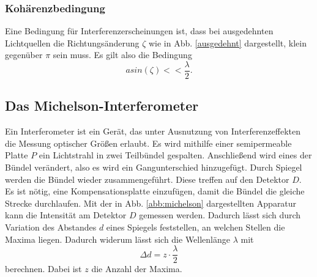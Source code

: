 
\subsubsection{Kohärenzbedingung}
Eine Bedingung für Interferenzerscheinungen ist, dass bei ausgedehnten 
Lichtquellen die Richtungsänderung $\zeta$ wie in Abb. \ref{ausgedehnt} dargestellt, 
klein gegenüber $\pi$ sein muss. Es gilt also die Bedingung 
\begin{equation*}
    a sin(\zeta) << \frac{\lambda}{2}.
\end{equation*}


\subsection{Das Michelson-Interferometer}
Ein Interferometer ist ein Gerät, das unter Ausnutzung von Interferenzeffekten die 
Messung optischer Größen erlaubt. 
Es wird mithilfe einer semipermeable Platte $P$ ein Lichtstrahl in zwei Teilbündel 
gespalten. Anschließend wird eines der Bündel verändert, also es wird ein Gangunterschied
hinzugefügt. Durch Spiegel werden die Bündel wieder zusammengeführt. Diese treffen
auf den Detektor $D$.
Es ist nötig, eine Kompensationsplatte einzufügen, damit die Bündel die gleiche Strecke
durchlaufen.
Mit der in Abb. \ref{abb:michelson} dargestellten Apparatur kann die Intensität am 
Detektor $D$ gemessen werden. Dadurch lässt sich durch Variation des Abstandes $d$ eines Spiegels 
feststellen, an welchen Stellen die Maxima liegen. Dadurch widerum lässt sich die 
Wellenlänge $\lambda$ mit 
\begin{equation}
    \Delta d = z \cdot \frac{\lambda}{2}
    \label{eqn:lambda}
\end{equation}
berechnen. Dabei ist $z$ die Anzahl der Maxima.

